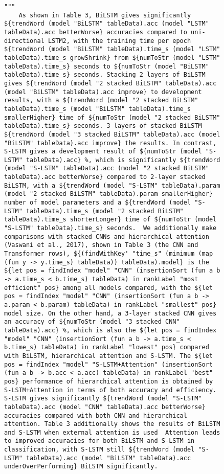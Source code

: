 \begin{figure}[h]
    \small
    \begin{lstlisting}[language=Fluid,mathescape=false]
"""
	As shown in Table 3, BiLSTM gives significantly ${trendWord (model "BiLSTM" tableData).acc (model "LSTM" tableData).acc betterWorse} accuracies compared to uni-directional LSTM2, with the training time per epoch ${trendWord (model "BiLSTM" tableData).time_s (model "LSTM" tableData).time_s growShrink} from ${numToStr (model "LSTM" tableData).time_s} seconds to ${numToStr (model "BiLSTM" tableData).time_s} seconds. Stacking 2 layers of BiLSTM gives ${trendWord (model "2 stacked BiLSTM" tableData).acc (model "BiLSTM" tableData).acc improve} to development results, with a ${trendWord (model "2 stacked BiLSTM" tableData).time_s (model "BiLSTM" tableData).time_s smallerHigher} time of ${numToStr (model "2 stacked BiLSTM" tableData).time_s} seconds. 3 layers of stacked BiLSTM ${trendWord (model "3 stacked BiLSTM" tableData).acc (model "BiLSTM" tableData).acc improve} the results. In contrast, S-LSTM gives a development result of ${numToStr (model "S-LSTM" tableData).acc} %, which is significantly ${trendWord (model "S-LSTM" tableData).acc (model "2 stacked BiLSTM" tableData).acc betterWorse} compared to 2-layer stacked BiLSTM, with a ${trendWord (model "S-LSTM" tableData).param (model "2 stacked BiLSTM" tableData).param smallerHigher} number of model parameters and a ${trendWord (model "S-LSTM" tableData).time_s (model "2 stacked BiLSTM" tableData).time_s shorterLonger} time of ${numToStr (model "S-LSTM" tableData).time_s} seconds.  We additionally make comparisons with stacked CNNs and hierarchical attention (Vaswani et al., 2017), shown in Table 3 (the CNN and Transformer rows), ${(findWithKey' "time_s" (minimum (map (fun y -> y.time_s) tableData)) tableData).model} is the ${let pos = findIndex "model" "CNN" (insertionSort (fun a b -> a.time_s < b.time_s) tableData) in rankLabel "most efficient" pos} among all models compared, with the ${let pos = findIndex "model" "CNN" (insertionSort (fun a b -> a.param < b.param) tableData) in rankLabel "smallest" pos} model size. On the other hand, a 3-layer stacked CNN gives an accuracy of ${numToStr (model "3 stacked CNN" tableData).acc} %, which is also the ${let pos = findIndex "model" "CNN" (insertionSort (fun a b -> a.time_s < b.time_s) tableData) in rankLabel "lowest" pos} compared with BiLSTM, hierarchical attention and S-LSTM. The ${let pos = findIndex "model" "S-LSTM+Attention" (insertionSort (fun a b -> b.acc < a.acc) tableData) in rankLabel "best" pos} performance of hierarchical attention is obtained by S-LSTM+Attention in terms of both accuracy and efficiency. S-LSTM gives significantly ${trendWord (model "S-LSTM" tableData).acc (model "CNN" tableData).acc betterWorse} accuracies compared with both CNN and hierarchical attention. Table 3 additionally shows the results of BiLSTM and S-LSTM when external attention is used  Attention leads to improved accuracies for both BiLSTM and S-LSTM in classification, with S-LSTM still ${trendWord (model "S-LSTM" tableData).acc (model "BiLSTM" tableData).acc underOverPerforming} BiLSTM significantly.

\end{lstlisting}
\end{figure}
